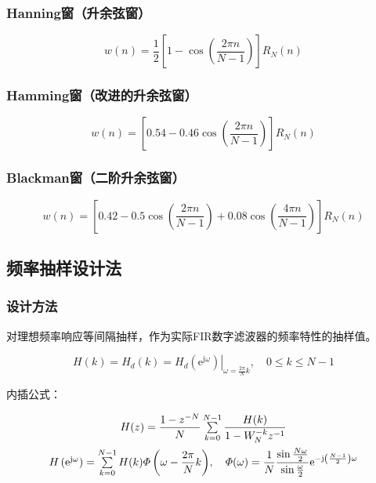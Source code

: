 \documentclass[cn, hazy, blue, normal, 12pt]{elegantnote}
\begin{document}
\subsubsection{Hanning窗（升余弦窗）}

\begin{equation}
    w(n)=\frac{1}{2}\left[1-\cos\left(\frac{2\pi n}{N-1}\right)\right]R_N(n)
\end{equation}

\subsubsection{Hamming窗（改进的升余弦窗）}

\begin{equation}
    w(n)=\left[0.54-0.46\cos\left(\frac{2\pi n}{N-1}\right)\right]R_N(n)
\end{equation}

\subsubsection{Blackman窗（二阶升余弦窗）}

\begin{equation}
    w(n)=\left[0.42-0.5\cos\left(\frac{2\pi n}{N-1}\right)+0.08\cos\left(\frac{4\pi n}{N-1}\right)\right]R_N(n)
\end{equation}

\subsection{频率抽样设计法}

\subsubsection{设计方法}

对理想频率响应等间隔抽样，作为实际FIR数字滤波器的频率特性的抽样值。

\begin{equation}
    H(k)=H_d(k)=\left.H_d\left(\text{e}^{\text{j}\omega}\right)\right|_{\omega=\frac{2\pi}{N}k},\quad 0\leq k\leq N-1
\end{equation}

内插公式：

\begin{equation}
\begin{array}{c}
    H(z)=\dfrac{1-z^{-N}}{N}\sum\limits_{k=0}^{N-1}{\dfrac{H(k)}{1-W_{N}^{-k}z^{-1}}} \\
    \addlinespace
    H\left(\text{e}^{\text{j}\omega}\right)=\sum\limits_{k=0}^{N-1}{H(k)\varPhi\left(\omega-\dfrac{2\pi}{N}k\right)}, \quad 
    \varPhi(\omega)=\dfrac{1}{N}\dfrac{\sin\frac{N\omega}{2}}{\sin\frac{\omega}{2}} \text{e}^{-\text{j}\left(\frac{N-1}{2}\right)\omega}
\end{array}
\end{equation}
\end{document}
